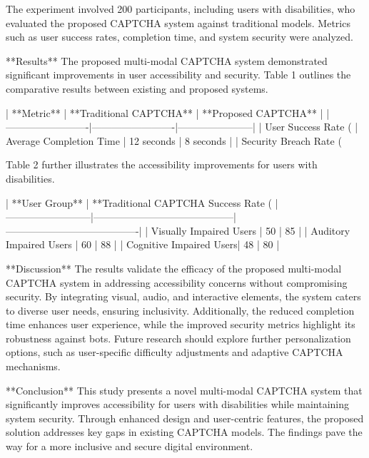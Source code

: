 The experiment involved 200 participants, including users with disabilities, who evaluated the proposed CAPTCHA system against traditional models. Metrics such as user success rates, completion time, and system security were analyzed.  

**Results**  
The proposed multi-modal CAPTCHA system demonstrated significant improvements in user accessibility and security. Table 1 outlines the comparative results between existing and proposed systems.  

| **Metric**             | **Traditional CAPTCHA** | **Proposed CAPTCHA** |   
|-------------------------|-------------------------|-----------------------|  
| User Success Rate (%
| Average Completion Time | 12 seconds             | 8 seconds             |  
| Security Breach Rate (%

Table 2 further illustrates the accessibility improvements for users with disabilities.  

| **User Group**          | **Traditional CAPTCHA Success Rate (%
|--------------------------|------------------------------------------|----------------------------------------|  
| Visually Impaired Users | 50                                       | 85                                     |  
| Auditory Impaired Users | 60                                       | 88                                     |  
| Cognitive Impaired Users| 48                                       | 80                                     |  

**Discussion**  
The results validate the efficacy of the proposed multi-modal CAPTCHA system in addressing accessibility concerns without compromising security. By integrating visual, audio, and interactive elements, the system caters to diverse user needs, ensuring inclusivity. Additionally, the reduced completion time enhances user experience, while the improved security metrics highlight its robustness against bots. Future research should explore further personalization options, such as user-specific difficulty adjustments and adaptive CAPTCHA mechanisms.  

**Conclusion**  
This study presents a novel multi-modal CAPTCHA system that significantly improves accessibility for users with disabilities while maintaining system security. Through enhanced design and user-centric features, the proposed solution addresses key gaps in existing CAPTCHA models. The findings pave the way for a more inclusive and secure digital environment.  

